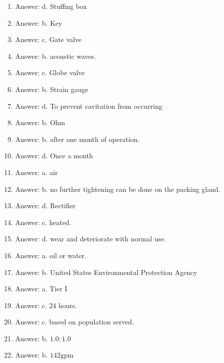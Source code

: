 \documentclass[10pt]{article}
\begin{document}
\begin{enumerate}
  \item Answer: d. Stuffing box

  \item Answer: b. Key

  \item Answer: c. Gate valve

  \item Answer: b. acoustic waves.

  \item Answer: c. Globe valve

  \item Answer: b. Strain gauge

  \item Answer: d. To prevent cavitation from occurring

  \item Answer: b. Ohm

  \item Answer: b. after one month of operation.

  \item Answer: d. Once a month

  \item Answer: a. air

  \item Answer: b. no further tightening can be done on the packing gland.

  \item Answer: d. Rectifier

  \item Answer: c. heated.

  \item Answer: d. wear and deteriorate with normal use.

  \item Answer: a. oil or water.

  \item Answer: b. United States Environmental Protection Agency

  \item Answer: a. Tier I

  \item Answer: c. 24 hours.

  \item Answer: c. based on population served.

  \item Answer: b. $1.0: 1.0$

  \item Answer: b. $142 \mathrm{gpm}$


\end{enumerate}
\end{document}
